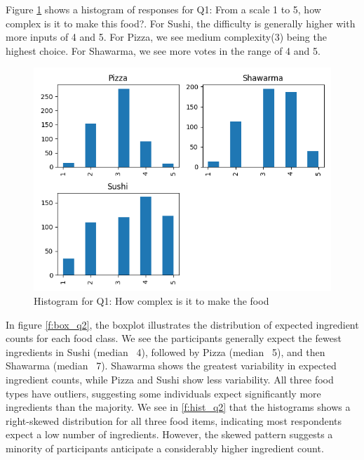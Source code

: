 Figure \ref{f:hist_q1} shows a histogram of responses for Q1: From a scale 1 to 5, how complex is it to make this food?. For Sushi, 
the difficulty is generally higher with more inputs of 4 and 5. For Pizza, we see medium complexity(3) being the highest choice. For Shawarma,
we see more votes in the range of 4 and 5.
\begin{figure}[h]
    \centerline{\includegraphics[width=\columnwidth]{data/histogram_Q1.png}}
    \caption{Histogram for Q1: How complex is it to make the food}
    \label{f:hist_q1}
\end{figure}


In figure \ref{f:box_q2}, the boxplot illustrates the distribution of expected ingredient counts for each food class. 
We see the participants generally expect the fewest ingredients in Sushi (median ~4), 
followed by Pizza (median ~5), and then Shawarma (median ~7). Shawarma shows the greatest variability in expected ingredient 
counts, while Pizza and Sushi show less variability. All three food types have outliers, suggesting some individuals expect 
significantly more ingredients than the majority. We see in \ref{f:hist_q2} that the histograms shows a right-skewed distribution 
for all three food items, indicating most respondents expect a low number of ingredients. 
However, the skewed pattern suggests a minority of participants anticipate a considerably higher ingredient count.

